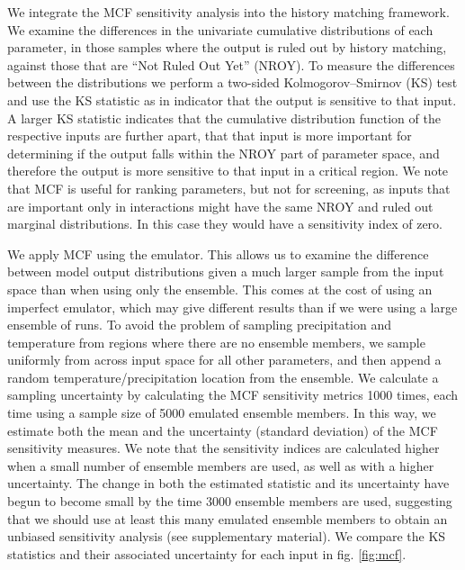 \documentclass[gmd, manuscript]{copernicus}
\begin{document}
We integrate the MCF sensitivity analysis into the history matching framework. We examine the differences in the univariate cumulative distributions of each parameter, in those samples where the output is ruled out by history matching, against those that are “Not Ruled Out Yet” (NROY). To measure the differences between the distributions we perform a two-sided Kolmogorov–Smirnov (KS) test and use the KS statistic as in indicator that the output is sensitive to that input. A larger KS statistic indicates that the cumulative distribution function of the respective inputs are further apart, that that input is more important for determining if the output falls within the NROY part of parameter space, and therefore the output is more sensitive to that input in a critical region. We note that MCF is useful for ranking parameters, but not for screening, as inputs that are important only in interactions might have the same NROY and ruled out marginal distributions. In this case they would have a sensitivity index of zero.

We apply MCF using the emulator. This allows us to examine the difference between model output distributions given a much larger sample from the input space than when using only the ensemble. This comes at the cost of using an imperfect emulator, which may give different results than if we were using a large ensemble of runs. To avoid the problem of sampling precipitation and temperature from regions where there are no ensemble members, we sample uniformly from across input space for all other parameters, and then append a random temperature/precipitation location from the ensemble. We calculate a sampling uncertainty by calculating the MCF sensitivity metrics 1000 times, each time using a sample size of 5000 emulated ensemble members. In this way, we estimate both the mean and the uncertainty (standard deviation) of the MCF sensitivity measures. We note that the sensitivity indices are calculated higher when a small number of ensemble members are used, as well as with a higher uncertainty. The change in both the estimated statistic and its uncertainty have begun to become small by the time 3000 ensemble members are used, suggesting that we should use at least this many emulated ensemble members to obtain an unbiased sensitivity analysis (see supplementary material). We compare the KS statistics and their associated uncertainty for each input in fig. \ref{fig:mcf}. 
\end{document}
